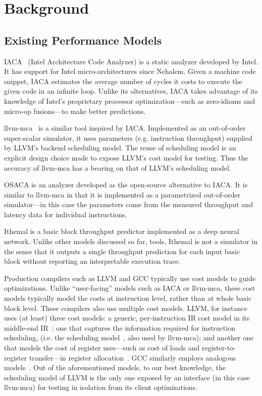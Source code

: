 \section{Background}

\subsection{Existing Performance Models}
\label{sec:perf-models}

IACA~\cite{iaca} (Intel Architecture Code Analyzer) is a static analyzer
developed by Intel. It has support for Intel micro-architectures
since Nehalem.
Given a machine code snippet, IACA estimates the average number
of cycles it costs to execute the given code in an infinite 
loop.
Unlike its alternatives, IACA takes advantage of its knowledge
of Intel's proprietary processor optimization---such as zero-idioms and micro-op fusions---to make better 
predictions.

llvm-mca~\cite{llvm-mca} is a similar tool inspired by IACA. 
Implemented as an out-of-order super-scalar simulator,
it uses parameters (e.g. instruction throughput)
supplied by LLVM\cite{llvm}'s backend scheduling model.
The reuse of scheduling model is an explicit design choice
made to expose LLVM's cost model for testing.
Thus the accuracy of llvm-mca has a bearing on
that of LLVM's scheduling model.

OSACA\cite{osaca} is an analyzer developed as the open-source
alternative to IACA. It is similar to llvm-mca in that
it is implemented as a parametrized out-of-order simulator---in
this case the parameters come from the measured throughput
and latency data for individual instructions.

Ithemal\cite{ithemal} is a basic block throughput predictor
implemented as a deep neural network. Unlike other models discussed so far, 
tools, Ithemal is not a simulator in the sense that it outputs
a single throughput prediction for each input basic block
without reporting an interpretable execution trace.

Production compilers such as LLVM\cite{llvm} and GCC typically use cost models 
to guide optimizations.
Unlike ``user-facing'' models such as IACA or llvm-mca, these cost models typically
model the costs at instruction level, rather than at whole basic block level.
These compilers also use multiple cost models.
LLVM, for instance uses (at least) three cost models: 
a generic, per-instruction IR cost model in its middle-end IR~\cite{llvm-cost};
one that captures the information required for instruction scheduling,
(i.e. the scheduling model~\cite{llvm-sched}, also used by llvm-mca);
and another one that models the cost of register uses---such as cost of loads
and register-to-register transfer---in register allocation~\cite{llvm-reg}.
GCC similarly employs analogous models~\cite{gcc-cost,gcc-sched}.
Out of the aforementioned models, to our best knowledge, 
the scheduling model of LLVM is the only one exposed by an interface
(in this case llvm-mca) for testing in isolation from its client optimizations.


